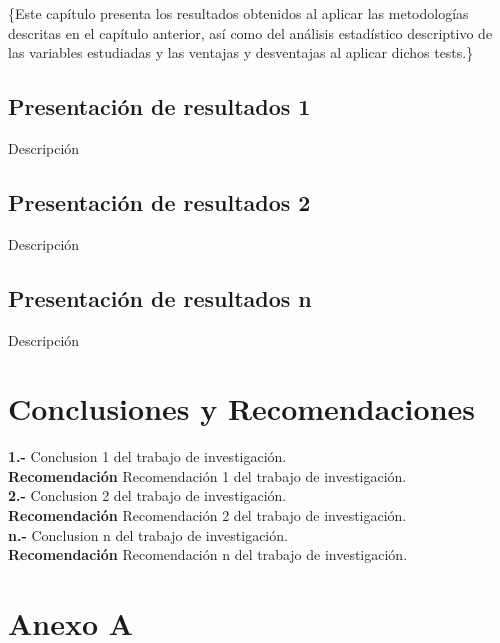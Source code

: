 \documentclass[oneside,11pt]{Latex/Classes/PhDthesisPSnPDF}
\begin{document}
\{\small Este capítulo presenta los resultados obtenidos al aplicar las
metodologías descritas en el capítulo anterior, así como del análisis
estadístico descriptivo de las variables estudiadas y las ventajas y
desventajas al aplicar dichos tests.\}

\section{Presentación de resultados 1}

Descripción\\

\section{Presentación de resultados 2}

Descripción\\

\section{Presentación de resultados n}

Descripción\\

\chapter{Conclusiones y Recomendaciones}

\textbf{1.-} Conclusion 1 del trabajo de investigación.\\

\textbf{Recomendación} Recomendación 1 del trabajo de investigación.\\

\textbf{2.-} Conclusion 2 del trabajo de investigación.\\

\textbf{Recomendación} Recomendación 2 del trabajo de investigación.\\

\textbf{n.-} Conclusion n del trabajo de investigación.\\

\textbf{Recomendación} Recomendación n del trabajo de investigación.\\

\appendix
\renewcommand{\thechapter}{\Alph{chapter}}

\chapter{Anexo A}
\end{document}
